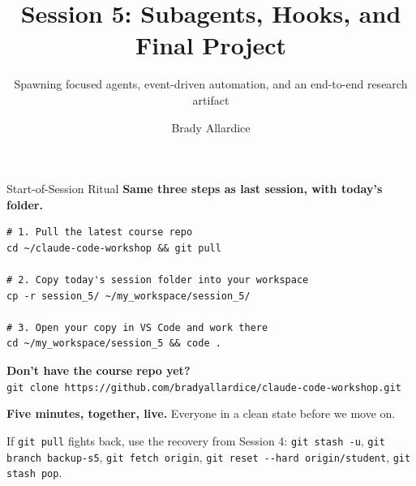 \documentclass[aspectratio=169, 11pt]{beamer}
\title{Session 5: Subagents, Hooks, and Final Project}
\subtitle{Spawning focused agents, event-driven automation, and an end-to-end research artifact}
\author{Brady Allardice}
\date{}
\institute{UPF \& IBEI}
\begin{document}
\begin{frame}[plain]
  \titlepage
\end{frame}


\begin{frame}[fragile]{Start-of-Session Ritual}
  \textbf{Same three steps as last session, with today's folder.}

  \vspace{0.4em}
  \begin{lstlisting}[basicstyle=\ttfamily\footnotesize]
# 1. Pull the latest course repo
cd ~/claude-code-workshop && git pull

# 2. Copy today's session folder into your workspace
cp -r session_5/ ~/my_workspace/session_5/

# 3. Open your copy in VS Code and work there
cd ~/my_workspace/session_5 && code .
  \end{lstlisting}

  \vspace{0.4em}
  {\small\textbf{Don't have the course repo yet?}\\
  \texttt{git clone https://github.com/bradyallardice/claude-code-workshop.git}}

  \vspace{0.4em}
  \textbf{Five minutes, together, live.} Everyone in a clean state before we move on.

  \vspace{0.2em}
  {\small If \texttt{git pull} fights back, use the recovery from Session 4: \texttt{git stash -u}, \texttt{git branch backup-s5}, \texttt{git fetch origin}, \texttt{git reset -{}-hard origin/student}, \texttt{git stash pop}.}
\end{frame}

\end{document}

